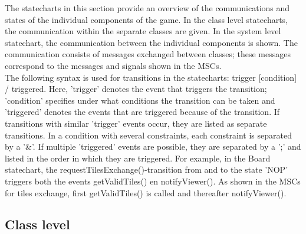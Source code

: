 The statecharts in this section provide an overview of the communications and states of the individual components of the game. In the class level statecharts, the communication within the separate classes are given. In the system level statechart, the communication between the individual components is shown. The communication consists of messages exchanged between classes; these messages correspond to the messages and signals shown in the MSCs. \\
The following syntax is used for transitions in the statecharts: trigger [condition] / triggered. Here, 'trigger' denotes the event that triggers the transition; 'condition' specifies under what conditions the transition can be taken and 'triggered' denotes the events that are triggered because of the transition. If transitions with similar 'trigger' events occur, they are listed as separate transitions. In a condition with several constraints, each constraint is separated by a '\&'. If multiple 'triggered' events are possible, they are separated by a ';' and listed in the order in which they are triggered. For example, in the Board statechart, the requestTilesExchange()-transition from and to the state 'NOP' triggers both the events getValidTiles() en notifyViewer(). As shown in the MSCs for tiles exchange, first getValidTiles() is called and thereafter notifyViewer().

\subsection{Class level}

